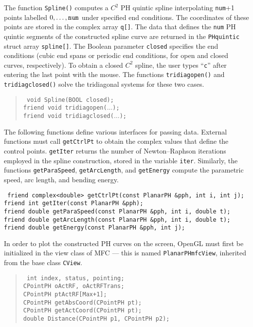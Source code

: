 \documentclass[12pt]{article}
\begin{document}
\bigskip\noindent
The function {\tt Spline()} computes a $C^2$ PH quintic spline 
interpolating {\tt num}+1 points labelled $0,\ldots,{\tt num}$ under 
specified end conditions. The coordinates of these points are stored in 
the complex array {\tt q[]}. The data that defines the {\tt num} PH quintic 
segments of the constructed spline curve are returned in the {\tt PHquintic} 
struct array {\tt spline[]}. The Boolean parameter {\tt closed} specifies 
the end conditions (cubic end spans or periodic end conditions, for open 
and closed curves, respectively). To obtain a closed $C^2$ spline, the 
user types ``{\tt c}'' after entering the last point with the mouse. 
The functions {\tt tridiag\underline{\hphantom{x}}open()} and 
{\tt tridiag\underline{\hphantom{x}}closed()} solve the tridiagonal 
systems for these two cases.

\begin{quote}
{\tt
void Spline(BOOL closed); \\
friend void tridiag\underline{\hphantom{x}}open($\ldots$); \\
friend void tridiag\underline{\hphantom{x}}closed($\ldots$);
}
\end{quote}

\noindent
The following functions define various interfaces for passing data. 
External functions must call {\tt getCtrlPt} to obtain the complex 
values that define the control points. {\tt getIter} returns the number of 
Newton--Raphson iterations employed in the spline construction, stored in 
the variable {\tt iter}. Similarly, the functions {\tt getParaSpeed}, 
{\tt getArcLength}, and {\tt getEnergy} compute the parametric speed, 
arc length, and bending energy.

\bigskip\noindent
{\tt
friend complex<double> getCtrlPt(const~PlanarPH~\&pph, int~i, int~j); \\
friend int getIter(const PlanarPH \&pph); \\
friend double getParaSpeed(const PlanarPH \&pph, int i, double t); \\
friend double getArcLength(const PlanarPH \&pph, int i, double t); \\
friend double getEnergy(const PlanarPH \&pph, int j);
}

\bigskip\noindent
In order to plot the constructed PH curves on the screen, OpenGL 
must first be initialized in the view class of MFC --- this is named 
{\tt PlanarPH\underline{\hphantom{x}}mfcView}, inherited from the base 
class {\tt CView}. 

\begin{quote}
{\tt
int index, status, pointing; \\
CPointPH o\underline{\hphantom{x}}ActRF, o\underline{\hphantom{x}}ActRFTrans; \\
CPointPH ptActRF[Max+1]; \\
CPointPH getAbsCoord(CPointPH pt); \\
CPointPH getActCoord(CPointPH pt); \\
double Distance(CPointPH p1, CPointPH p2);
}
\end{quote}
\end{document}
